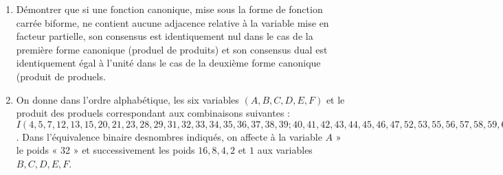 \begin{enumerate} [label=\arabic*$^\circ$]
 
\emph{Réponse :}



\[ f_1 = 
\begin{array}{|c|}   A \\ \overline{B} . \overline{C} \\   \end{array}
     \text{, } \quad f_2 = \begin{array}{|c|} A \\ C \\ D \\ \end{array} 
      \text{, } \quad f_3 = \begin{array}{|c|} \overline{x_1} \\ x_3 \end{array} 
\]




\[ f_4 = 
\begin{array}{|c|c|}   
    x_1 & \overline{x_3} \\
    \overline{x_2} & \overline{x_1} \\	    
\end{array}
    = \begin{array}{|c|}
          x_0 . \overline{x_1} . \overline{x_2} \\ 
          x_0 . x_1 . \overline{x_3} \\
      \end{array} 
       \text{, } \quad f_5 = \begin{array}{c|c|} 
       							$\multirow{2}{*}{$A$}$ & \overline{B} \\
       							                       & C \\
                             \end{array} 
\]



\item Démontrer que si une fonction canonique, mise sous la forme de fonction carrée biforme, ne contient aucune adjacence relative à la variable mise en facteur partielle, son consensus est identiquement nul dans le cas de la première forme canonique (produel de produits) et son consensus dual est identiquement égal à l'unité dans le cas de la deuxième forme canonique (produit de produels. 

\item On donne dans l'ordre alphabétique, les six variables $ (A, B, C, D, E, F)$ et le produit des produels correspondant aux combinaisons suivantes : $I (4, 5, 7, 12, 13, 15, 20, 21, 23, 28, 29, 31, 32, 33, 34, 35, 36, 37, 38, 39; 40, 41, 42, 43, 44, 45, 46, 47, 52, 53, 55, 56, 57, 58, 59, 60, 61, 62, 63)$. Dans l'équivalence binaire desnombres indiqués, on affecte à la variable  $A$ » le poids  « 32 » et successivement les poids $16, 8, 4, 2$ et $1$ aux variables $B, C, D, E, F$. 


\end{enumerate}
